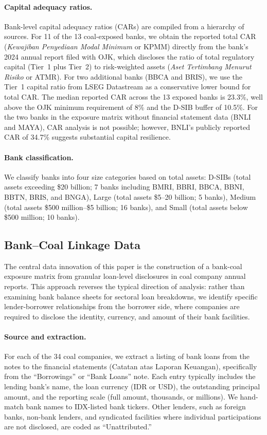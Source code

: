 \paragraph{Capital adequacy ratios.} Bank-level capital adequacy ratios (CARs) are compiled from a hierarchy of sources. For 11 of the 13 coal-exposed banks, we obtain the reported total CAR (\textit{Kewajiban Penyediaan Modal Minimum} or KPMM) directly from the bank's 2024 annual report filed with OJK, which discloses the ratio of total regulatory capital (Tier~1 plus Tier~2) to risk-weighted assets (\textit{Aset Tertimbang Menurut Risiko} or ATMR). For two additional banks (BBCA and BRIS), we use the Tier~1 capital ratio from LSEG Datastream as a conservative lower bound for total CAR. The median reported CAR across the 13 exposed banks is 23.3\%, well above the OJK minimum requirement of 8\% and the D-SIB buffer of 10.5\%. For the two banks in the exposure matrix without financial statement data (BNLI and MAYA), CAR analysis is not possible; however, BNLI's publicly reported CAR of 34.7\% suggests substantial capital resilience.

\paragraph{Bank classification.} We classify banks into four size categories based on total assets: D-SIBs (total assets exceeding \$20 billion; 7 banks including BMRI, BBRI, BBCA, BBNI, BBTN, BRIS, and BNGA), Large (total assets \$5--20 billion; 5 banks), Medium (total assets \$500 million--\$5 billion; 16 banks), and Small (total assets below \$500 million; 10 banks). 


\subsection{Bank--Coal Linkage Data}
\label{subsec:linkage_data}

The central data innovation of this paper is the construction of a bank-coal exposure matrix from granular loan-level disclosures in coal company annual reports. This approach reverses the typical direction of analysis: rather than examining bank balance sheets for sectoral loan breakdowns, we identify specific lender-borrower relationships from the borrower side, where companies are required to disclose the identity, currency, and amount of their bank facilities.

\paragraph{Source and extraction.} For each of the 34 coal companies, we extract a listing of bank loans from the notes to the financial statements (Catatan atas Laporan Keuangan), specifically from the ``Borrowings'' or ``Bank Loans'' note. Each entry typically includes the lending bank's name, the loan currency (IDR or USD), the outstanding principal amount, and the reporting scale (full amount, thousands, or millions). We hand-match bank names to IDX-listed bank tickers. Other lenders, such as foreign banks, non-bank lenders, and syndicated facilities where individual participations are not disclosed, are coded as ``Unattributed.''

